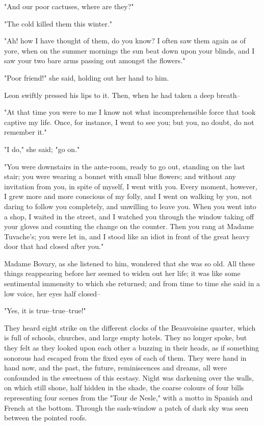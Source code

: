 \documentclass[11pt,twocolumn]{ltugboat}
\begin{document}
"And our poor cactuses, where are they?"

"The cold killed them this winter."

"Ah! how I have thought of them, do you know? I often saw them again as
of yore, when on the summer mornings the sun beat down upon your blinds,
and I saw your two bare arms passing out amongst the flowers."

"Poor friend!" she said, holding out her hand to him.

Leon swiftly pressed his lips to it. Then, when he had taken a deep
breath--

"At that time you were to me I know not what incomprehensible force that
took captive my life. Once, for instance, I went to see you; but you, no
doubt, do not remember it."

"I do," she said; "go on."

"You were downstairs in the ante-room, ready to go out, standing on
the last stair; you were wearing a bonnet with small blue flowers; and
without any invitation from you, in spite of myself, I went with you.
Every moment, however, I grew more and more conscious of my folly, and
I went on walking by you, not daring to follow you completely, and
unwilling to leave you. When you went into a shop, I waited in the
street, and I watched you through the window taking off your gloves and
counting the change on the counter. Then you rang at Madame Tuvache's;
you were let in, and I stood like an idiot in front of the great heavy
door that had closed after you."

Madame Bovary, as she listened to him, wondered that she was so old. All
these things reappearing before her seemed to widen out her life; it was
like some sentimental immensity to which she returned; and from time to
time she said in a low voice, her eyes half closed--

"Yes, it is true--true--true!"

They heard eight strike on the different clocks of the Beauvoisine
quarter, which is full of schools, churches, and large empty hotels.
They no longer spoke, but they felt as they looked upon each other a
buzzing in their heads, as if something sonorous had escaped from the
fixed eyes of each of them. They were hand in hand now, and the past,
the future, reminiscences and dreams, all were confounded in the
sweetness of this ecstasy. Night was darkening over the walls, on which
still shone, half hidden in the shade, the coarse colours of four bills
representing four scenes from the "Tour de Nesle," with a motto in
Spanish and French at the bottom. Through the sash-window a patch of
dark sky was seen between the pointed roofs.
\end{document}
